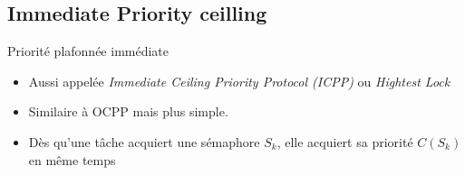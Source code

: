 \subsection{Immediate Priority ceilling}

\begin{frame}{Priorité plafonnée immédiate}
  \begin{itemize}
  \item  Aussi  appelée  \emph{Immediate  Ceiling  Priority  Protocol
      (ICPP)} ou \emph{Hightest Lock}
  \item Similaire à OCPP mais plus simple.
  \item Dès  qu'une tâche acquiert une sémaphore  $S_k$, elle acquiert
    sa priorité $C(S_k)$ en même temps
  \end{itemize}
\end{frame}

